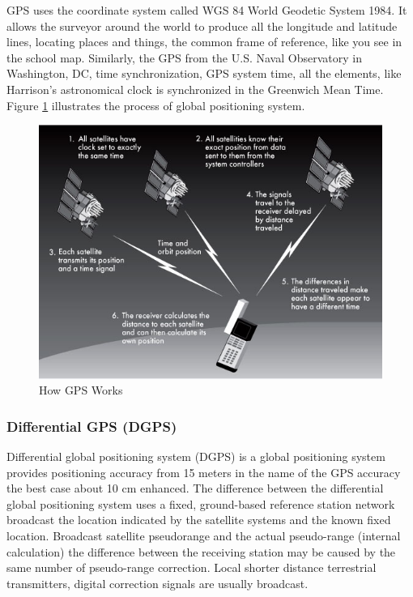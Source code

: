\documentclass[12pt,a4paper]{article}
\begin{document}
GPS uses the coordinate system called WGS 84 World Geodetic System 1984. It allows the surveyor around the world to produce all the longitude and latitude lines, locating places and things, the common frame of reference, like you see in the school map. Similarly, the GPS from the U.S. Naval Observatory in Washington, DC, time synchronization, GPS system time, all the elements, like Harrison's astronomical clock is synchronized in the Greenwich Mean Time. Figure \ref{fig:howgpsworks} illustrates the process of global positioning system.

\begin{figure}
\centering
\includegraphics[width=.85\textwidth]{fig/5steps-illustration}
\caption{How GPS Works}
\label{fig:howgpsworks}
\end{figure}


\subsubsection{Differential GPS (DGPS)} %
\label{ssub:differential_gps_dgps_}
Differential global positioning system (DGPS) is a global positioning system provides positioning accuracy from 15 meters in the name of the GPS accuracy the best case about 10 cm enhanced. The difference between the differential global positioning system uses a fixed, ground-based reference station network broadcast the location indicated by the satellite systems and the known fixed location. Broadcast satellite pseudorange and the actual pseudo-range (internal calculation) the difference between the receiving station may be caused by the same number of pseudo-range correction. Local shorter distance terrestrial transmitters, digital correction signals are usually broadcast. \cite{wiki-dgps}
\end{document}
